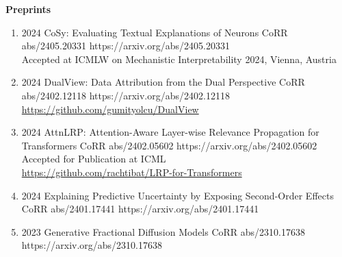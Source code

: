 \headedsection %
{\bf Preprints}{}
{
    \begin{enumerate}

        \item {}
                        {2024}
                        {CoSy: Evaluating Textual Explanations of Neurons}
                        {CoRR abs/2405.20331}
                        {https://arxiv.org/abs/2405.20331}
                        {\\ Accepted at ICMLW on Mechanistic Interpretability 2024, Vienna, Austria}

        \item {}
                        {2024}
                        {DualView: Data Attribution from the Dual Perspective}
                        {CoRR abs/2402.12118}
                        {https://arxiv.org/abs/2402.12118}
                        {\\\href{https://github.com/gumityolcu/DualView}{https://github.com/gumityolcu/DualView}}

        \item {}
                        {2024}
                        {AttnLRP: Attention-Aware Layer-wise Relevance Propagation for Transformers}
                        {CoRR abs/2402.05602}
                        {https://arxiv.org/abs/2402.05602}
                        {   Accepted for Publication at ICML
                            \\\href{https://github.com/rachtibat/LRP-for-Transformers}{https://github.com/rachtibat/LRP-for-Transformers}}


        \item {}
                        {2024}
                        {Explaining Predictive Uncertainty by Exposing Second-Order Effects}
                        {CoRR abs/2401.17441}
                        {https://arxiv.org/abs/2401.17441}

        \item {}
                        {2023}
                        {Generative Fractional Diffusion Models}
                        {CoRR abs/2310.17638}
                        {https://arxiv.org/abs/2310.17638}


\end{enumerate}}
